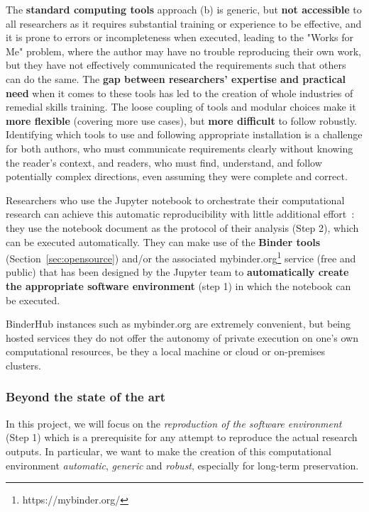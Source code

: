 The \textbf{standard computing tools} approach (b) is generic, but \textbf{not accessible} to all researchers
as it requires substantial training or experience to be effective,
and it is prone to errors or incompleteness when executed,
leading to the "Works for Me" problem,
where the author may have no trouble reproducing their own work,
but they have not effectively communicated the requirements such that others can do the same.
The \textbf{gap between researchers' expertise and practical need} when it comes to these tools has led to the creation
of whole industries of remedial skills training.
The loose coupling of tools and modular choices make it \textbf{more flexible} (covering more use cases),
but \textbf{more difficult} to follow robustly.
Identifying which tools to use and following appropriate installation is a challenge
for both authors, who must communicate requirements clearly without knowing the reader's context,
and readers, who must find, understand, and follow potentially complex directions, even assuming they were
complete and correct.

\medskip Researchers who use the Jupyter notebook to orchestrate their
computational research can achieve this automatic
reproducibility with little additional effort~\cite{Beg2021}: they use the notebook document as
the protocol of their analysis (Step 2), which can be executed automatically.
They can make use of the \textbf{Binder tools} (Section~\ref{sec:opensource}) and/or the
associated  mybinder.org\footnote{https://mybinder.org/} service (free and public) that has
been designed by the Jupyter team to \textbf{automatically create the appropriate
software environment} (step 1) in which the notebook can be executed.

BinderHub instances such as mybinder.org are extremely convenient,
but being hosted services they do not offer the autonomy
of private execution on one's own computational resources,
be they a local machine or cloud or on-premises clusters.

\subsubsection{Beyond the state of the art}

In this project, we will focus on the \emph{reproduction of the
software environment} (Step 1) which is a prerequisite for any attempt to
reproduce the actual research outputs. In particular, we want to make the
creation of this computational environment \emph{automatic}, \emph{generic} and \emph{robust},
especially for long-term preservation.

